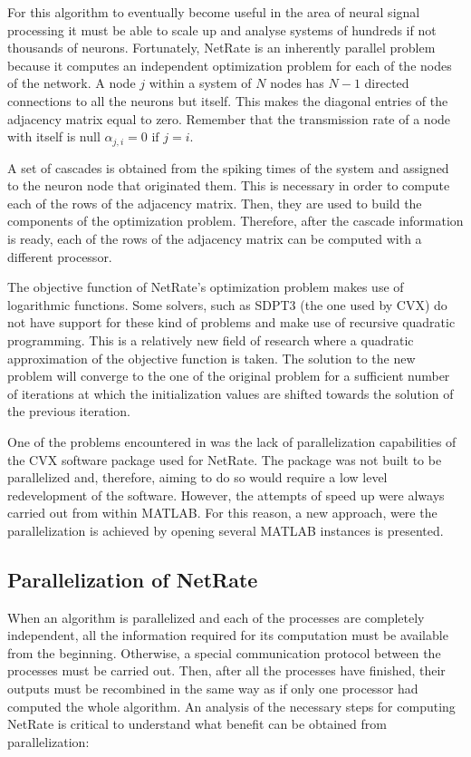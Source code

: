 \documentclass[11pt]{article}
\begin{document}
For this algorithm to eventually become useful in the area of neural signal processing it must be able to scale up and analyse systems of hundreds if not thousands of neurons. Fortunately, NetRate is an inherently parallel problem because it computes an independent optimization problem for each of the nodes of the network. A node \(j\) within a system of \(N\) nodes has \(N-1\) directed connections to all the neurons but itself. This makes the diagonal entries of the adjacency matrix equal to zero. Remember that the transmission rate of a node with itself is null \(\alpha_{j,i} = 0 \text{ if } j=i\).  

A set of cascades is obtained from the spiking times of the system and assigned to the neuron node that originated them. This is necessary in order to compute each of the rows of the adjacency matrix. Then, they are used to build the components of the optimization problem. Therefore, after the cascade information is ready, each of the rows of the adjacency matrix can be computed with a different processor.

The objective function of NetRate's optimization problem makes use of logarithmic functions. Some solvers, such as SDPT3 \cite{toh1999sdpt3,tutuncu2003solving} (the one used by CVX) do not have support for these kind of problems and make use of recursive quadratic programming. This is a relatively new field of research \cite{powell1986recursive} where a quadratic approximation of the objective function is taken. The solution to the new problem will converge to the one of the original problem for a sufficient number of iterations at which the initialization values are shifted towards the solution of the previous iteration.

One of the problems encountered in \cite{pranav_report} was the lack of parallelization capabilities of the CVX software package used for NetRate. The package was not built to be parallelized and, therefore, aiming to do so would require a low level redevelopment of the software. However, the attempts of speed up were always carried out from within MATLAB. For this reason, a new approach, were the parallelization is achieved by opening several MATLAB instances is presented. 

\subsection{Parallelization of NetRate}

When an algorithm is parallelized and each of the processes are completely independent, all the information required for its computation must be available from the beginning. Otherwise, a special communication protocol between the processes must be carried out. Then, after all the processes have finished, their outputs must be recombined in the same way as if only one processor had computed the whole algorithm. An analysis of the necessary steps for computing NetRate is critical to understand what benefit can be obtained from parallelization:
\end{document}
